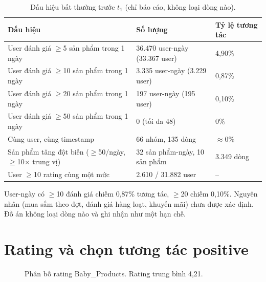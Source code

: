 \documentclass[11pt,a4paper,oneside]{report}
\newcommand{\rstar}{\ensuremath{\bigstar}}
\begin{document}
\begin{table}[h]
\centering\small
\caption{Dấu hiệu bất thường trước $t_1$ (chỉ báo cáo, không loại dòng nào).}\label{tab:anomaly}
\begin{tabularx}{\linewidth}{Yp{4.2cm}p{2.2cm}}
\toprule
Dấu hiệu & Số lượng & Tỷ lệ tương tác \\
\midrule
User đánh giá $\ge$5 sản phẩm trong 1 ngày & 36.470 user-ngày (33.367 user) & 4,90\% \\
User đánh giá $\ge$10 sản phẩm trong 1 ngày & 3.335 user-ngày (3.229 user) & 0,87\% \\
User đánh giá $\ge$20 sản phẩm trong 1 ngày & 197 user-ngày (195 user) & 0,10\% \\
User đánh giá $\ge$50 sản phẩm trong 1 ngày & 0 (tối đa 48) & 0\% \\
Cùng user, cùng timestamp & 66 nhóm, 135 dòng & $\approx$0\% \\
Sản phẩm tăng đột biến ($\ge$50/ngày, $\ge$10$\times$ trung vị) & 32 sản phẩm-ngày, 10 sản phẩm & 3.349 dòng \\
User $\ge$10 rating cùng một mức & 2.610 / 31.882 user & -- \\
\bottomrule
\end{tabularx}
\end{table}
User-ngày có $\ge$10 đánh giá chiếm 0,87\% tương tác, $\ge$20 chiếm 0,10\%. Nguyên nhân (mua sắm theo đợt, đánh giá hàng loạt, khuyến mãi) chưa được xác định. Đồ án không loại dòng nào và ghi nhận như một hạn chế.

\section{Rating và chọn tương tác positive}
\begin{figure}[h]
\centering
{}
\caption{Phân bố rating Baby\_Products. Rating trung bình 4,21.}\label{fig:rating}
\end{figure}
\end{document}
